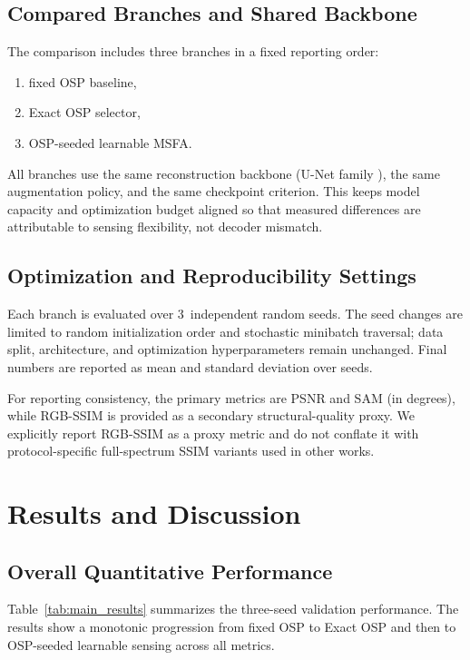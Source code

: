 \documentclass[journal]{IEEEtran}
\newcommand{\NumSeeds}{3}
\begin{document}
\subsection{Compared Branches and Shared Backbone}
The comparison includes three branches in a fixed reporting order:
\begin{enumerate}
\item fixed OSP baseline,
\item Exact OSP selector,
\item OSP-seeded learnable MSFA.
\end{enumerate}
All branches use the same reconstruction backbone (U-Net family \cite{ronneberger2015}), the same augmentation policy, and the same checkpoint criterion. This keeps model capacity and optimization budget aligned so that measured differences are attributable to sensing flexibility, not decoder mismatch.

\subsection{Optimization and Reproducibility Settings}
Each branch is evaluated over \NumSeeds\ independent random seeds. The seed changes are limited to random initialization order and stochastic minibatch traversal; data split, architecture, and optimization hyperparameters remain unchanged. Final numbers are reported as mean and standard deviation over seeds.

For reporting consistency, the primary metrics are PSNR and SAM (in degrees), while RGB-SSIM is provided as a secondary structural-quality proxy. We explicitly report RGB-SSIM as a proxy metric and do not conflate it with protocol-specific full-spectrum SSIM variants used in other works.

\section{Results and Discussion}
\subsection{Overall Quantitative Performance}
Table~\ref{tab:main_results} summarizes the three-seed validation performance. The results show a monotonic progression from fixed OSP to Exact OSP and then to OSP-seeded learnable sensing across all metrics.
\end{document}
